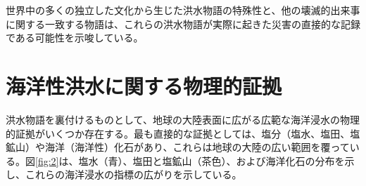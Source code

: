 \documentclass[10pt,twocolumn,letterpaper]{article}
\begin{document}


世界中の多くの独立した文化から生じた洪水物語の特殊性と、他の壊滅的出来事に関する一致する物語は、これらの洪水物語が実際に起きた災害の直接的な記録である可能性を示唆している。

\section{海洋性洪水に関する物理的証拠}

洪水物語を裏付けるものとして、地球の大陸表面に広がる広範な海洋浸水の物理的証拠がいくつか存在する。最も直接的な証拠としては、塩分（塩水、塩田、塩鉱山）や海洋（海洋性）化石があり、これらは地球の大陸の広い範囲を覆っている。図\ref{fig:2}は、塩水（青）、塩田と塩鉱山（茶色）、および海洋化石\cite{15,16,86,87}の分布を示し、これらの海洋浸水の指標の広がりを示している。
\end{document}
